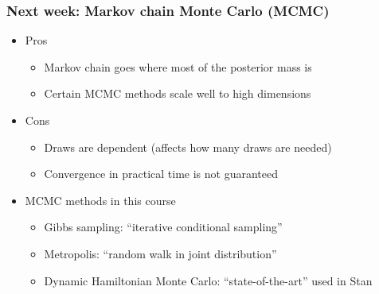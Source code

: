 \documentclass[10pt]{beamer}
\begin{document}
\begin{frame}
\frametitle{Next week: Markov chain Monte Carlo (MCMC)}

  \begin{itemize}
  \item Pros
    \begin{itemize}
    \item Markov chain goes where most of the posterior mass is
    \item Certain MCMC methods scale well to high dimensions
    \end{itemize}
  \item Cons
    \begin{itemize}
    \item Draws are dependent (affects how many draws are needed)
    \item Convergence in practical time is not guaranteed
    \end{itemize}
  \pause
  \item MCMC methods in this course
    \begin{itemize}
    \item Gibbs sampling: ``iterative conditional sampling''
    \item Metropolis: ``random walk in joint distribution''
    \item Dynamic Hamiltonian Monte Carlo: ``state-of-the-art'' used in Stan
    \end{itemize}
  \end{itemize}

\end{frame}


\end{document}
